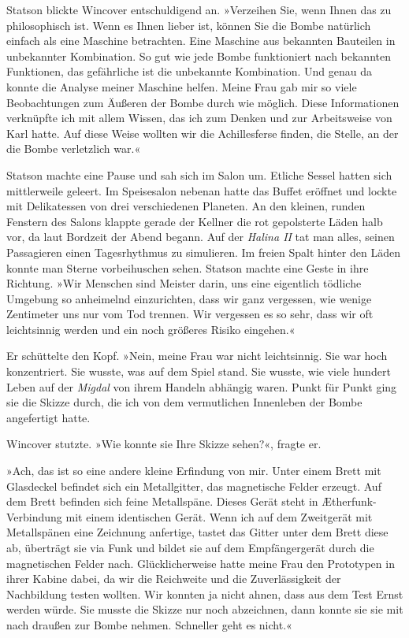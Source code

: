 Statson blickte Wincover entschuldigend an. »Verzeihen Sie, wenn
Ihnen das zu philosophisch ist. Wenn es Ihnen lieber ist, können
Sie die Bombe natürlich einfach als eine Maschine betrachten. Eine
Maschine aus bekannten Bauteilen in unbekannter Kombination. So gut
wie jede Bombe funktioniert nach bekannten Funktionen, das
gefährliche ist die unbekannte Kombination. Und genau da konnte die
Analyse meiner Maschine helfen. Meine Frau gab mir so viele
Beobachtungen zum Äußeren der Bombe durch wie möglich. Diese
Informationen verknüpfte ich mit allem Wissen, das ich zum Denken
und zur Arbeitsweise von Karl hatte. Auf diese Weise wollten wir
die Achillesferse finden, die Stelle, an der die Bombe verletzlich
war.«

Statson machte eine Pause und sah sich im Salon um. Etliche Sessel
hatten sich mittlerweile geleert. Im Speisesalon nebenan hatte das
Buffet eröffnet und lockte mit Delikatessen von drei verschiedenen
Planeten. An den kleinen, runden Fenstern des Salons klappte gerade
der Kellner die rot gepolsterte Läden halb vor, da laut Bordzeit
der Abend begann. Auf der \textit{Halina II} tat man alles, seinen
Passagieren einen Tagesrhythmus zu simulieren. Im freien Spalt
hinter den Läden konnte man Sterne vorbeihuschen sehen. Statson
machte eine Geste in ihre Richtung. »Wir Menschen sind Meister
darin, uns eine eigentlich tödliche Umgebung so anheimelnd
einzurichten, dass wir ganz vergessen, wie wenige Zentimeter uns
nur vom Tod trennen. Wir vergessen es so sehr, dass wir oft
leichtsinnig werden und ein noch größeres Risiko eingehen.«

Er schüttelte den Kopf. »Nein, meine Frau war nicht leichtsinnig.
Sie war hoch konzentriert. Sie wusste, was auf dem Spiel stand. Sie
wusste, wie viele hundert Leben auf der \textit{Migdal} von ihrem Handeln
abhängig waren. Punkt für Punkt ging sie die Skizze durch, die ich
von dem vermutlichen Innenleben der Bombe angefertigt hatte.

Wincover stutzte. »Wie konnte sie Ihre Skizze sehen?«, fragte er.

»Ach, das ist so eine andere kleine Erfindung von mir. Unter einem
Brett mit Glasdeckel befindet sich ein Metallgitter, das
magnetische Felder erzeugt. Auf dem Brett befinden sich feine
Metallspäne. Dieses Gerät steht in Ætherfunk-Verbindung mit einem
identischen Gerät. Wenn ich auf dem Zweitgerät mit Metallspänen
eine Zeichnung anfertige, tastet das Gitter unter dem Brett diese
ab, überträgt sie via Funk und bildet sie auf dem Empfängergerät
durch die magnetischen Felder nach. Glücklicherweise hatte meine
Frau den Prototypen in ihrer Kabine dabei, da wir die Reichweite
und die Zuverlässigkeit der Nachbildung testen wollten. Wir konnten
ja nicht ahnen, dass aus dem Test Ernst werden würde. Sie musste
die Skizze nur noch abzeichnen, dann konnte sie sie mit nach
draußen zur Bombe nehmen. Schneller geht es nicht.«

